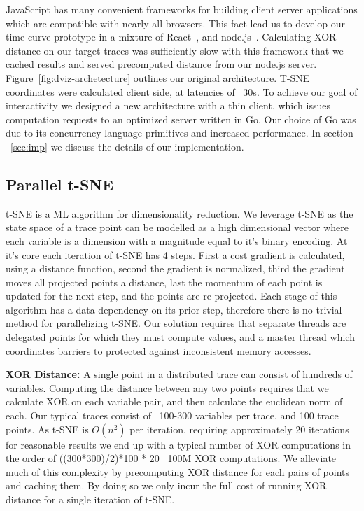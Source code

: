 JavaScript has many convenient frameworks for building client server
applications which are compatible with nearly all browsers. This fact lead us
to develop our time curve prototype in a mixture of React~\cite{react}, and
node.js~\cite{nodejs}. Calculating XOR distance on our target traces was
sufficiently slow with this framework that we cached results and served
precomputed distance from our node.js server. Figure~\ref{fig:dviz-archetecture} outlines our original architecture. T-SNE coordinates
were calculated client side, at latencies of ~30s. To achieve our goal of
interactivity we designed a new architecture with a thin client, which issues
computation requests to an optimized server written in Go. Our choice of Go was
due to its concurrency language primitives and increased performance. In
section ~\ref{sec:imp} we discuss the details of our implementation.

\subsection{Parallel t-SNE}
\label{sec:ptsne}
t-SNE is a ML algorithm for dimensionality reduction. We leverage t-SNE as the
state space of a trace point can be modelled as a high dimensional vector where
each variable is a dimension with a magnitude equal to it's binary encoding. At
it's core each iteration of t-SNE has 4 steps. First a cost gradient is
calculated, using a distance function, second the gradient is normalized, third
the gradient moves all projected points a distance, last the momentum of each
point is updated for the next step, and the points are re-projected. Each stage
of this algorithm has a data dependency on its prior step, therefore there is
no trivial method for parallelizing t-SNE. Our solution requires that separate
threads are delegated points for which they must compute values, and a master
thread which coordinates barriers to protected against inconsistent memory
accesses.



\noindent\textbf{XOR Distance:} A single point in a distributed trace can
consist of hundreds of variables.  Computing the distance between any
two points requires that we calculate XOR on each variable pair, and
then calculate the euclidean norm of each. Our typical traces consist
of ~100-300 variables per trace, and 100 trace points. As t-SNE is
$O(n^2)$ per iteration, requiring approximately 20 iterations for
reasonable results we end up with a typical number of XOR computations
in the order of ((300*300)/2)*100 * 20 ~100M XOR computations. We
alleviate much of this complexity by precomputing XOR distance for each
pairs of points and caching them. By doing so we only incur the full
cost of running XOR distance for a single iteration of t-SNE.



